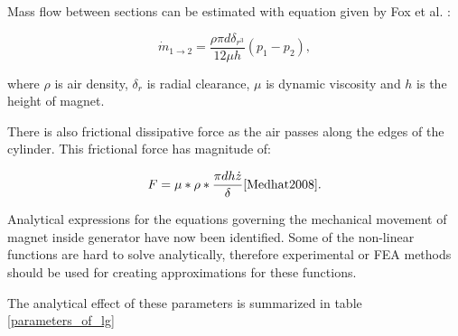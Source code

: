 Mass flow between sections can be estimated with equation given by Fox et al. \cite{Fox2008}:

\begin{equation}
  \dot{m}_{1 \rightarrow 2} = \frac{\rho \pi d \delta_{r^3}}{12\mu h}(p_1-p_2),
\end{equation}

where $\rho$ is air density, $\delta_r$ is radial clearance, $\mu$ is dynamic viscosity and $h$ is the height of magnet. \cite{Tornincasa2012}

There is also frictional dissipative force as the air passes along the edges of the cylinder. This frictional force has magnitude of: 

\begin{equation}
  F = \mu * \rho * \frac{\pi d h \dot{z}}{\delta} \cite{Medhat2008}. 
\end{equation}

Analytical expressions for the equations governing the mechanical movement of magnet inside generator have now been identified. Some of the non-linear functions are hard to solve analytically, therefore experimental or FEA methods should be used for creating approximations for these functions.

The analytical effect of these parameters is summarized in table \ref{parameters_of_lg}

\begin{table}[htb]
\caption{\label{parameters_of_lg} Effect of parameters of generator}
\begin{center}
\end{center}
\end{table}


